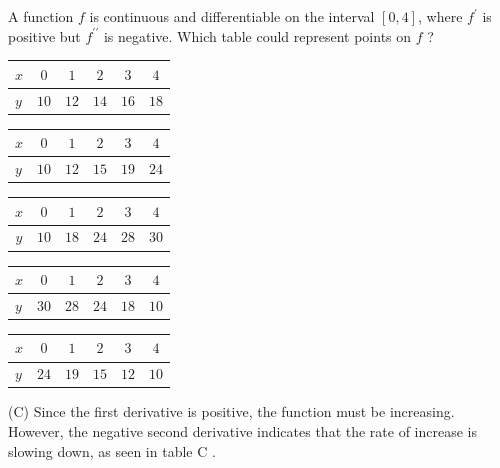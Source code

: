 \question
A function $f$ is continuous and differentiable on the interval $[0,4]$, where $f^{\prime}$ is positive but $f^{\prime \prime}$ is negative. Which table could represent points on $f$ ?
\begin{choices}
  \choice \begin{center}
\begin{tabular}{l|c|c|c|c|c}
$x$ & $0$ & $1$ & $2$ & $3$ & $4$ \\
\hline
$y$ & $10$ & $12$ & $14$ & $16$ & $18$ \\
\end{tabular}
\end{center}
  \choice \begin{center}
\begin{tabular}{l|c|c|c|c|c}
$x$ & $0$ & $1$ & $2$ & $3$ & $4$ \\
\hline
$y$ & $10$ & $12$ & $15$ & $19$ & $24$ \\
\end{tabular}
\end{center}
  \CorrectChoice \begin{center}
\begin{tabular}{c|c|c|c|c|c}
$x$ & $0$ & $1$ & $2$ & $3$ & $4$ \\
\hline
$y$ & $10$ & $18$ & $24$ & $28$ & $30$ \\
\end{tabular}
\end{center}
  \choice \begin{center}
\begin{tabular}{l|c|c|c|c|c}
$x$ & $0$ & $1$ & $2$ & $3$ & $4$ \\
\hline
$y$ & $30$ & $28$ & $24$ & $18$ & $10$ \\
\end{tabular}
\end{center}
  \choice \begin{center}
\begin{tabular}{l|c|c|c|c|c}
$x$ & $0$ & $1$ & $2$ & $3$ & $4$ \\
\hline
$y$ & $24$ & $19$ & $15$ & $12$ & $10$ \\
\end{tabular}
\end{center}
\end{choices}
\begin{solution}
(C) Since the first derivative is positive, the function must be increasing. However, the negative second derivative indicates that the rate of increase is slowing down, as seen in table C .
\end{solution}






